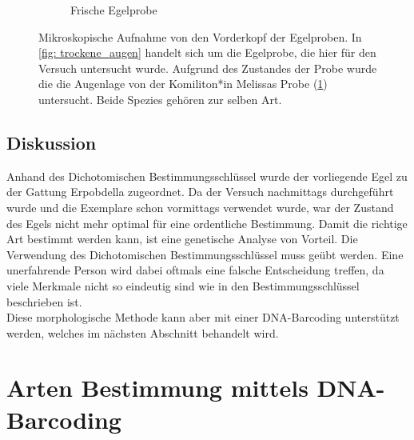 \documentclass[oneside,10pt,a4paper]{report}
\begin{document}
\begin{figure}[H]
\begin{subfigure}[b]{0.37\textwidth}
						\caption{Frische Egelprobe}
						\label{fig:feuchte_augen}
					\end{subfigure}
					\caption{Mikroskopische Aufnahme von den Vorderkopf der Egelproben. In \ref{fig: trockene_augen} handelt sich um die Egelprobe, die hier für den Versuch untersucht wurde. Aufgrund des Zustandes der Probe wurde die die Augenlage von der Komiliton*in Melissas Probe (\ref{fig:feuchte_augen}) untersucht. Beide Spezies gehören zur selben Art.}
					\label{fig: Dicho_augent}
				\end{figure}
			
			
			\subsection{Diskussion}
				Anhand des Dichotomischen Bestimmungsschlüssel wurde der vorliegende Egel zu der Gattung Erpobdella zugeordnet.
				Da der Versuch nachmittags durchgeführt wurde und die Exemplare schon vormittags verwendet wurde, war der Zustand des Egels nicht mehr optimal für eine ordentliche Bestimmung.
				Damit die richtige Art bestimmt werden kann, ist eine genetische Analyse von Vorteil. Die Verwendung des Dichotomischen Bestimmungsschlüssel muss geübt werden. Eine unerfahrende Person wird dabei oftmals eine falsche Entscheidung treffen, da viele Merkmale nicht so eindeutig sind wie in den Bestimmungsschlüssel beschrieben ist.\\
				Diese morphologische Methode kann aber mit einer DNA-Barcoding unterstützt werden, welches im nächsten Abschnitt behandelt wird.
		
		\section{Arten Bestimmung mittels DNA-Barcoding}
\end{document}
